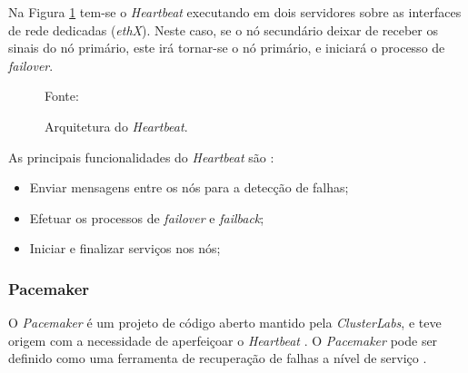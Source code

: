Na Figura \ref{fig:heartbeat} tem-se o \textit{Heartbeat} executando em dois servidores sobre as interfaces de rede dedicadas (\textit{ethX}).
Neste caso, se o nó secundário deixar de receber os sinais do nó primário, este irá tornar-se o nó primário, e iniciará o processo de 
\textit{failover}. 
\begin{figure}[h!]
 \centering
 \caption{Arquitetura do \textit{Heartbeat}.}
 Fonte: \citet{zaminhani2008}
 \label{fig:heartbeat}
\end{figure}

As principais funcionalidades do \textit{Heartbeat} são \cite{clusterlabs}:
\begin{itemize}
 \item Enviar mensagens entre os nós para a detecção de falhas;
 \item Efetuar os processos de \textit{failover} e \textit{failback};
 \item Iniciar e finalizar serviços nos nós;
\end{itemize}


\subsubsection{Pacemaker}
\label{section:pacemaker}
O \textit{Pacemaker} \cite{pacemaker} é um projeto de código aberto mantido pela \textit{ClusterLabs}, e teve origem com a necessidade de 
aperfeiçoar o \textit{Heartbeat} \cite{heartbeat}. 
O \textit{Pacemaker} pode ser definido como uma ferramenta de recuperação de falhas a nível de serviço \cite{perkov2011}. 

